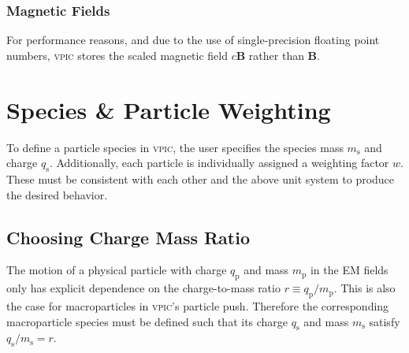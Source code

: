 \documentclass[twocolumn,10pt]{article}
\renewcommand{\vec}[1]{\mathbf{#1}}
\begin{document}
\subsubsection{Magnetic Fields}

For performance reasons, and due to the use of single-precision floating point numbers, \textsc{vpic} stores the scaled magnetic field $c\vec{B}$ rather than $\vec{B}$.

\section{Species \& Particle Weighting}

To define a particle species in \textsc{vpic}, the user specifies the species mass $m_{\mathrm{s}}$ and charge $q_{\mathrm{s}}$. Additionally, each particle is individually assigned a weighting factor $w$. These must be consistent with each other and the above unit system to produce the desired behavior.

\subsection{Choosing Charge Mass Ratio}

The motion of a physical particle with charge $q_{\mathrm{p}}$ and mass $m_{\mathrm{p}}$ in the EM fields only has explicit dependence on the charge-to-mass ratio $r \equiv q_{\mathrm{p}}/m_{\mathrm{p}}$. This is also the case for macroparticles in \textsc{vpic}'s particle push. Therefore the corresponding macroparticle species must be defined such that its charge $q_{\mathrm{s}}$ and mass $m_{\mathrm{s}}$ satisfy $q_{\mathrm{s}}/m_{\mathrm{s}}=r$.
\end{document}
